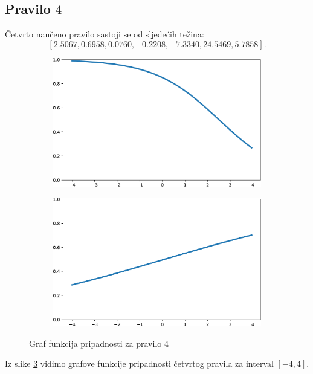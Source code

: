 \documentclass[12pt, a4paper, numeric]{article}
\begin{document}
\subsection{Pravilo $4$}
Četvrto naučeno pravilo sastoji se od sljedećih težina: 
\[[2.5067, 0.6958, 0.0760, -0.2208, -7.3340, 24.5469, 5.7858].\]
\begin{figure}[th!]
    \centering
    \begin{subfigure}{.5\textwidth}
        \centering
        \includegraphics[width=.9\linewidth]{img/A4}
        \captionsetup{justification=centering}
        \caption{}
        \label{fig:a4}
    \end{subfigure}%
    \begin{subfigure}{.5\textwidth}
        \centering
        \includegraphics[width=.9\linewidth]{img/B4}
        \captionsetup{justification=centering}
        \caption{}
        \label{fig:b4}
    \end{subfigure}
    \caption{Graf funkcija pripadnosti za pravilo 4}
    \label{fig:pripasdnost4}
\end{figure}
Iz slike \ref{fig:pripasdnost4} vidimo grafove funkcije pripadnosti četvrtog pravila za interval $[-4, 4]$.
\end{document}
